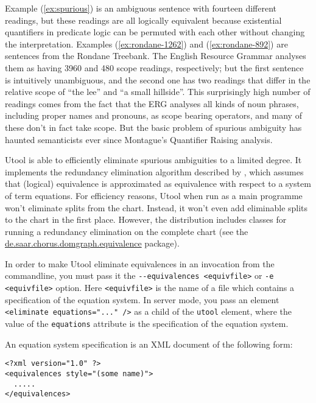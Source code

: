 Example (\ref{ex:spurious}) is an ambiguous sentence with fourteen
different readings, but these readings are all logically equivalent
because existential quantifiers in predicate logic can be permuted
with each other without changing the interpretation. Examples
(\ref{ex:rondane-1262}) and (\ref{ex:rondane-892}) are sentences from
the Rondane Treebank. The English Resource Grammar analyses them as
having 3960 and 480 scope readings, respectively; but the first
sentence is intuitively unambiguous, and the second one has two
readings that differ in the relative scope of ``the lee'' and ``a
small hillside''. This surprisingly high number of readings comes from
the fact that the ERG analyses all kinds of noun phrases, including
proper names and pronouns, as scope bearing operators, and many of
these don't in fact take scope. But the basic problem of spurious
ambiguity has haunted semanticists ever since Montague's Quantifier
Raising analysis.

Utool is able to efficiently eliminate spurious ambiguities to a
limited degree. It implements the redundancy elimination algorithm
described by , which assumes that (logical)
equivalence is approximated as equivalence with respect to a system of
term equations. For efficiency reasons, Utool when run as a main
programme won't eliminate splits from the chart. Instead, it won't
even add eliminable splits to the chart in the first place. However,
the distribution includes classes for running a redundancy elimination
on the complete chart (see the
\url{de.saar.chorus.domgraph.equivalence} package).

In order to make Utool eliminate equivalences in an invocation from
the commandline, you must pass it the
\verb?--equivalences <equivfile>? or \verb?-e <equivfile>?
option. Here \verb?<equivfile>? is the name of a file which contains a
specification of the equation system. In server mode, you pass an
element \verb?<eliminate equations="..." />? as a child of the
\verb?utool? element, where the value of the \verb?equations?
attribute is the specification of the equation system.

An equation system specification is an XML document of the following
form:

\begin{verbatim}
<?xml version="1.0" ?>
<equivalences style="(some name)">   
  .....
</equivalences>
\end{verbatim}


